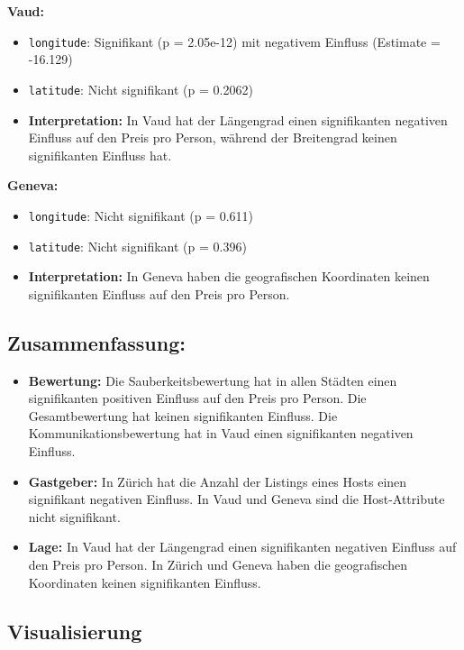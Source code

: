 \documentclass[
  journal,
]{IEEEtran}%
\providecommand{\tightlist}{%
  \setlength{\itemsep}{0pt}\setlength{\parskip}{0pt}}\usepackage{longtable,booktabs,array}
\begin{document}
\textbf{Vaud:}

\begin{itemize}
\item
  \texttt{longitude}: Signifikant (p = 2.05e-12) mit negativem Einfluss
  (Estimate = -16.129)
\item
  \texttt{latitude}: Nicht signifikant (p = 0.2062)
\item
  \textbf{Interpretation:} In Vaud hat der Längengrad einen
  signifikanten negativen Einfluss auf den Preis pro Person, während der
  Breitengrad keinen signifikanten Einfluss hat.
\end{itemize}

\textbf{Geneva:}

\begin{itemize}
\item
  \texttt{longitude}: Nicht signifikant (p = 0.611)
\item
  \texttt{latitude}: Nicht signifikant (p = 0.396)
\item
  \textbf{Interpretation:} In Geneva haben die geografischen Koordinaten
  keinen signifikanten Einfluss auf den Preis pro Person.
\end{itemize}

\hypertarget{zusammenfassung}{%
\subsection{Zusammenfassung:}\label{zusammenfassung}}

\begin{itemize}
\tightlist
\item
  \textbf{Bewertung:} Die Sauberkeitsbewertung hat in allen Städten
  einen signifikanten positiven Einfluss auf den Preis pro Person. Die
  Gesamtbewertung hat keinen signifikanten Einfluss. Die
  Kommunikationsbewertung hat in Vaud einen signifikanten negativen
  Einfluss.
\item
  \textbf{Gastgeber:} In Zürich hat die Anzahl der Listings eines Hosts
  einen signifikant negativen Einfluss. In Vaud und Geneva sind die
  Host-Attribute nicht signifikant.
\item
  \textbf{Lage:} In Vaud hat der Längengrad einen signifikanten
  negativen Einfluss auf den Preis pro Person. In Zürich und Geneva
  haben die geografischen Koordinaten keinen signifikanten Einfluss.
\end{itemize}

\hypertarget{visualisierung-1}{%
\subsection{\texorpdfstring{\textbf{Visualisierung}}{Visualisierung}}\label{visualisierung-1}}
\end{document}
